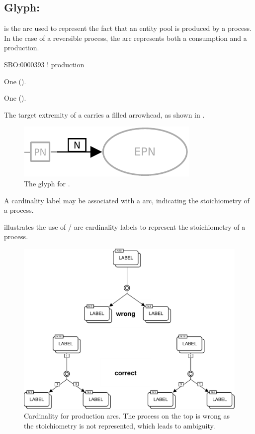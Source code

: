\subsection{Glyph: }
\label{sec:production}

 is the arc used to represent the fact that an entity pool is produced by a process. In the case of a reversible process, the  arc represents both a consumption and a production.

\begin{glyphDescription}

\glyphSboTerm
SBO:0000393 ! production

\glyphOrigin
One  ().

\glyphTarget
One  ().

\glyphSymbol
The target extremity of a  carries a filled arrowhead, as shown in .

\end{glyphDescription}

\begin{figure}[H]
  \centering
  \includegraphics{images/production}
  \caption{The \PD glyph for .}
  \label{fig:production}
\end{figure}

A cardinality label may be associated with a  arc, indicating the stoichiometry of a process.

 illustrates the use of / arc cardinality labels to represent the stoichiometry of a process.

\begin{figure}[H]
  \centering
  \includegraphics[scale = 0.6]{examples/stoichEx1}
  \caption{Cardinality for production arcs.
  The process on the top is wrong as the stoichiometry is not represented, which leads to ambiguity.}
  \label{fig:prod-card}
\end{figure}

